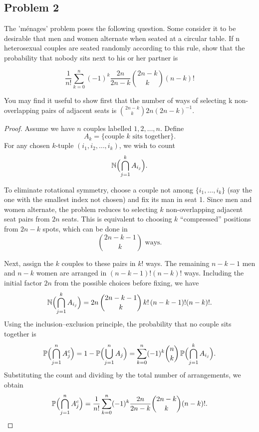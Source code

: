\documentclass[letterpaper, 11pt]{article}
\newcommand{\1}{\mathds{1}}	%
\theoremstyle{definition}
\begin{document}
\subsection*{Problem 2}
The 'ménages' problem poses the following question. Some consider it to be desirable that men and women alternate when seated at a circular table. If n heterosexual couples are seated randomly according to this rule, show that the probability that nobody sits next to his or her partner is

$$\frac{1}{n!}\sum_{k=0}^{n}(-1)^k\frac{2n}{2n-k}\binom{2n-k}{k}(n-k)!$$

You may find it useful to show first that the number of ways of selecting k non-overlapping pairs of adjacent seats is $\binom{2n-k}{k}2n(2n-k)^{-1}$.
\begin{proof}
    Assume we have \(n\) couples labelled \(1,2,\dots,n\). Define
\[
A_k = \{\text{couple } k \text{ sits together}\}.
\]
For any chosen \(k\)-tuple \((i_1,i_2,\dots,i_k)\), we wish to count 
\[
\mathbb{N}\Bigl(\bigcap_{j=1}^k A_{i_j}\Bigr).
\]

To eliminate rotational symmetry, choose a couple not among \(\{i_1,\dots,i_k\}\) (say the one with the smallest index not chosen) and fix its man in seat 1. Since men and women alternate, the problem reduces to selecting \(k\) non-overlapping adjacent seat pairs from \(2n\) seats. This is equivalent to choosing \(k\) “compressed” positions from \(2n-k\) spots, which can be done in
\[
\binom{2n-k-1}{k}\text{ ways}.
\]

Next, assign the \(k\) couples to these pairs in \(k!\) ways. The remaining \(n-k-1\) men and \(n-k\) women are arranged in \((n-k-1)! (n-k)!\) ways. Including the initial factor \(2n\) from the possible choices before fixing, we have
\[
\mathbb{N}\Bigl(\bigcap_{j=1}^k A_{i_j}\Bigr) = 2n\,\binom{2n-k-1}{k}\,k!\,(n-k-1)!(n-k)!.
\]
Using the inclusion--exclusion principle, the probability that no couple sits together is
\[
\mathbb{P}\Bigl(\bigcap_{j=1}^n A_j^c\Bigr) = 1-\mathbb{P}\Bigl(\bigcup_{j=1}^n A_j\Bigr)
=\sum_{k=0}^n (-1)^k \binom{n}{k}\,\mathbb{P}\Bigl(\bigcap_{j=1}^k A_{i_j}\Bigr).
\]
Substituting the count and dividing by the total number of arrangements, we obtain
\[
\mathbb{P}\Bigl(\bigcap_{j=1}^n A_j^c\Bigr) = \frac{1}{n!}\sum_{k=0}^n (-1)^k \frac{2n}{2n-k}\binom{2n-k}{k}(n-k)!.
\]
 \end{proof}
\end{document}
